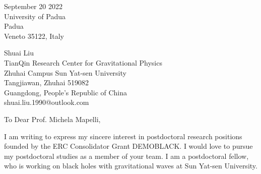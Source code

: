 \documentclass[11pt,a4paper,sans]{letter} %
\date{}
\begin{document}

\begin{letter}{September 20 2022 \\
University of Padua\\
Padua\\ 
Veneto 35122, Italy}

Shuai Liu \\
TianQin Research Center for Gravitational Physics \\
Zhuhai Campus Sun Yat-sen University \\
Tangjiawan, Zhuhai 519082 \\
Guangdong, People's Republic of China \\
shuai.liu.1990@outlook.com








\opening{To Dear Prof. Michela Mapelli,} 
 
    I am writing to express my sincere interest in postdoctoral research positions founded by the ERC Consolidator Grant
    DEMOBLACK. I would love to
pursue my postdoctoral studies as a member of your team. I am a postdoctoral fellow, who is working on black holes with
    gravitational waves at Sun Yat-sen University.


\end{letter}
\end{document}
